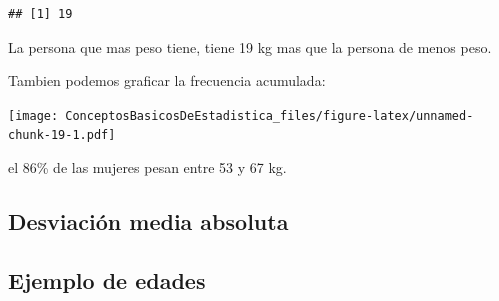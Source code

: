 \documentclass[twocolumn]{article}
\newenvironment{Shaded}{\begin{snugshade}}{\end{snugshade}}
\newcommand{\KeywordTok}[1]{\textcolor[rgb]{0.13,0.29,0.53}{\textbf{#1}}}
\newcommand{\DataTypeTok}[1]{\textcolor[rgb]{0.13,0.29,0.53}{#1}}
\newcommand{\DecValTok}[1]{\textcolor[rgb]{0.00,0.00,0.81}{#1}}
\newcommand{\StringTok}[1]{\textcolor[rgb]{0.31,0.60,0.02}{#1}}
\newcommand{\OperatorTok}[1]{\textcolor[rgb]{0.81,0.36,0.00}{\textbf{#1}}}
\newcommand{\NormalTok}[1]{#1}
\begin{document}
\begin{verbatim}
## [1] 19
\end{verbatim}

La persona que mas peso tiene, tiene 19 kg mas que la persona de menos
peso.

Tambien podemos graficar la frecuencia acumulada:

\begin{Shaded}
\end{Shaded}

\texttt{[image: ConceptosBasicosDeEstadistica\_files/figure-latex/unnamed-chunk-19-1.pdf]}

el 86\% de las mujeres pesan entre 53 y 67 kg.

\subsection{Desviación media
absoluta}\label{desviaciuxf3n-media-absoluta}

\subsection{Ejemplo de edades}\label{ejemplo-de-edades}
\end{document}
